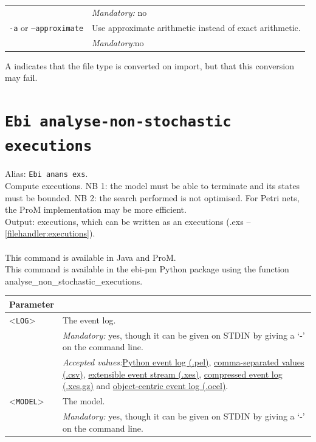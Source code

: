 {\begin{tabularx}{\linewidth}{lX}
&\textit{Mandatory:} \quad no\\
\texttt{-a} or \texttt{--approximate} & Use approximate arithmetic instead of exact arithmetic.\\
&\textit{Mandatory:}\quad no\\
\bottomrule
\end{tabularx}
A \textdagger{} indicates that the file type is converted on import, but that this conversion may fail.
\clearpage\section{\texttt{Ebi analyse-non-stochastic executions}}
\label{command:Ebi analyse-non-stochastic executions}
Alias: \texttt{Ebi anans exs}.\\
Compute executions.
NB 1: the model must be able to terminate and its states must be bounded.
NB 2: the search performed is not optimised. For Petri nets, the ProM implementation may be more efficient.\\
\noindent Output: executions, which can be written as an executions (.exs -- \cref{filehandler:executions}).\\
\\This command is available in Java and ProM.
\\This command is available in the ebi-pm Python package using the function analyse\_non\_stochastic\_executions.
\begin{tabularx}{\linewidth}{lX}
\toprule
Parameter \\\midrule
<\texttt{LOG}>&The event log.\\
&\textit{Mandatory:} \quad yes, though it can be given on STDIN by giving a `-' on the command line.\\
&\textit{Accepted values:}\quad \hyperref[filehandler:Python event log]{Python event log (.pel)}, \hyperref[filehandler:comma-separated values]{comma-separated values (.csv)}, \hyperref[filehandler:extensible event stream]{extensible event stream (.xes)}, \hyperref[filehandler:compressed event log]{compressed event log (.xes.gz)} and \hyperref[filehandler:object-centric event log]{object-centric event log (.ocel)}.\\
<\texttt{MODEL}>&The model.\\
&\textit{Mandatory:} \quad yes, though it can be given on STDIN by giving a `-' on the command line.\\

\end{tabularx}}
